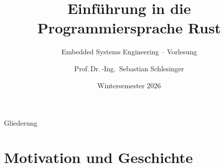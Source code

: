 \documentclass[%
  aspectratio=169,
  10pt
]{beamer}
\title[Einführung in Rust]{Einführung in die Programmiersprache Rust}
\subtitle{Embedded Systems Engineering -- Vorlesung}
\author[Schlesinger]{Prof.\,Dr.\,-Ing.\ Sebastian Schlesinger}
\institute{%
  Fachbereich 2 -- Duales Studium Wirtschaft \& Technik\\
  HWR Berlin}
\date{Wintersemester 2026}
\begin{document}

\begin{frame}[plain]
  \titlepage
\end{frame}

\begin{frame}{Gliederung}
  \tableofcontents
\end{frame}

\section{Motivation und Geschichte}
\end{document}
